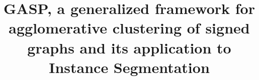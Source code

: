 \documentclass[10pt,twocolumn,letterpaper]{article}
\theoremstyle{definition}
\theoremstyle{remark}
\begin{document}
\title{GASP, a generalized framework for agglomerative clustering of signed graphs and its application to Instance Segmentation} %





\end{document}
